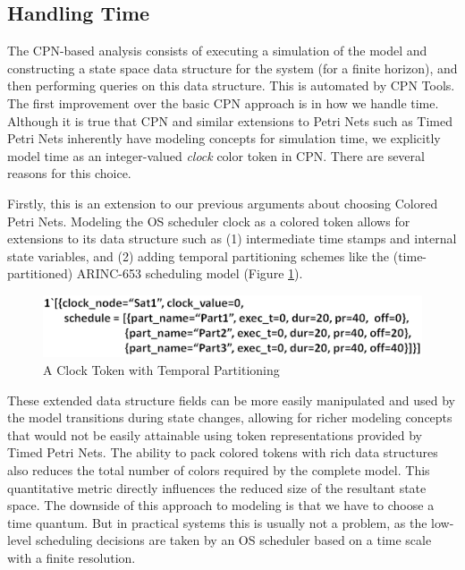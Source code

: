 % 


\subsection{Handling Time}
\label{handling_time}

The CPN-based analysis consists of executing a simulation of the model and constructing a state space data structure for the system (for a finite horizon), and then performing queries on this data structure. This is automated by CPN Tools. The first improvement over the basic CPN approach is in how we handle time. Although it is true that CPN and similar extensions to Petri Nets such as Timed Petri Nets inherently have modeling concepts for simulation time, we explicitly model time as an integer-valued \emph{clock} color token in CPN. There are several reasons for this choice. 

Firstly, this is an extension to our previous arguments about choosing Colored Petri Nets. Modeling the OS scheduler clock as a colored token allows for extensions to its data structure such as (1) intermediate time stamps and internal state variables, and (2) adding temporal partitioning schemes like the (time-partitioned) ARINC-653 \cite{ARINC-653} scheduling model (Figure \ref{fig:clock}). 

\begin{figure}[h]
	\centering
	\includegraphics[width=\textwidth]{./img/clock}
	\caption{A Clock Token with Temporal Partitioning}
	\label{fig:clock}
\end{figure}

These extended data structure fields can be more easily manipulated and used by the model transitions during state changes, allowing for richer modeling concepts that would not be easily attainable using token representations provided by Timed Petri Nets. The ability to pack colored tokens with rich data structures also reduces the total number of colors required by the complete model. This quantitative metric directly influences the reduced size of the resultant state space. The downside of this approach to modeling is that we have to choose a time quantum. But in practical systems this is usually not a problem, as the low-level scheduling decisions are taken by an OS scheduler based on a time scale with a finite resolution. 

